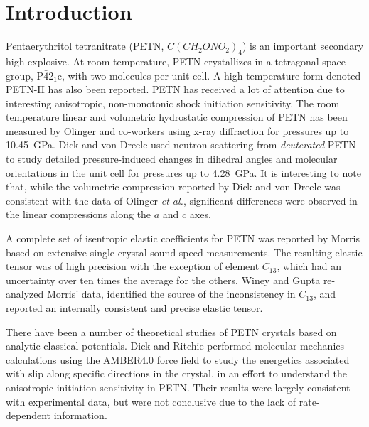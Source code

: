 \documentclass[prb,aps,nobibnotes,twocolumn,doublespace,twocolumngrid,superbib]{revtex4}
\begin{document}
\section{Introduction}
Pentaerythritol tetranitrate (PETN, $C(CH_2ONO_2)_4$) is an important
secondary high explosive.  At room temperature, PETN crystallizes in a
tetragonal space group, P$\bar{4}$2$_1$c, with two molecules per unit
cell\cite{Booth_1947v,Trotter_1963v16,Conant_1979}.  A
high-temperature form denoted PETN-II has also been
reported.\cite{Cady_1975vB41} PETN has received a lot of attention due
to interesting anisotropic, non-monotonic shock initiation
sensitivity.\cite{Dick_1984v44,Dick_1991v70,Gallagher_1992v339,Dick_1997v81,Gruzdkov_2000v104,Yoo_2000v88}
The room temperature linear and volumetric hydrostatic compression of
PETN has been measured by Olinger and
co-workers\cite{Olinger_1975v62,Olinger_1976} using x-ray diffraction
for pressures up to 10.45~GPa.  Dick and von Dreele\cite{Dick_1997}
used neutron scattering from {\it deuterated} PETN to study detailed
pressure-induced changes in dihedral angles and molecular orientations
in the unit cell for pressures up to 4.28~GPa.  It is interesting to
note that, while the volumetric compression reported by Dick and von
Dreele was consistent with the data of Olinger {\it et al.},
significant differences were observed in the linear compressions along
the $a$ and $c$ axes.

A complete set of isentropic elastic coefficients for PETN was
reported by Morris\cite{Morris_1976} based on extensive single crystal
sound speed measurements.  The resulting elastic tensor was of high
precision with the exception of element $C_{13}$, which had an
uncertainty over ten times the average for the others.  Winey and
Gupta\cite{Winey_2001v90} re-analyzed Morris' data, identified the
source of the inconsistency in $C_{13}$, and reported an internally
consistent and precise elastic tensor.

There have been a number of theoretical studies of PETN crystals based
on analytic classical potentials.  Dick and Ritchie\cite{Dick_1994v76}
performed molecular mechanics calculations using the AMBER4.0 force
field to study the energetics associated with slip along specific
directions in the crystal, in an effort to understand the anisotropic
initiation sensitivity in PETN.  Their results were largely consistent
with experimental data, but were not conclusive due to the lack of
rate-dependent information. 
\end{document}
